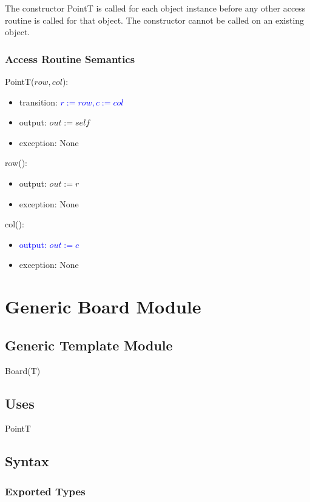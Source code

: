 \documentclass[12pt]{article}
\begin{document}
The constructor PointT is called for each object instance before any other
access routine is called for that object.  The constructor cannot be called on
an existing object.

\subsubsection* {Access Routine Semantics}

PointT($row, col$):
\begin{itemize}
\item transition: \textcolor{blue}{$r := row, c := col$}

\item output: $out := \mathit{self}$
\item exception: None
\end{itemize}

\noindent row():
\begin{itemize}
\item output: $out := r$
\item exception: None
\end{itemize}

\noindent col():
\begin{itemize}
\item \textcolor{blue}{output: $out := c$}
\item exception: None
\end{itemize}

\newpage

\section* {Generic Board Module}

\subsection* {Generic Template Module}

Board(T)

\subsection* {Uses}

PointT

\subsection* {Syntax}

\subsubsection* {Exported Types}
\end{document}
